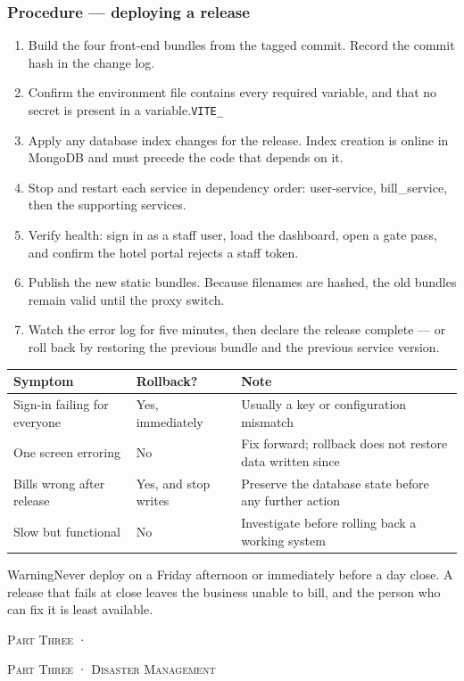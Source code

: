 \documentclass[11pt,a4paper,oneside]{book}
\begin{document}
\subsubsection*{Procedure — deploying a release}
\begin{enumerate}
\item Build the four front-end bundles from the tagged commit. Record the commit hash in the change log.
\item Confirm the environment file contains every required variable, and that no secret is present in a  variable.\texttt{VITE\_}
\item Apply any database index changes for the release. Index creation is online in MongoDB and must precede the code that depends on it.
\item Stop and restart each service in dependency order: user-service, bill\_service, then the supporting services.
\item Verify health: sign in as a staff user, load the dashboard, open a gate pass, and confirm the hotel portal rejects a staff token.
\item Publish the new static bundles. Because filenames are hashed, the old bundles remain valid until the proxy switch.
\item Watch the error log for five minutes, then declare the release complete — or roll back by restoring the previous bundle and the previous service version.
\end{enumerate}
\begin{center}\small
\begin{tabularx}{\linewidth}{|X|X|X|}
\hline
\rowcolor{lightgrey}
\textbf{Symptom} & \textbf{Rollback?} & \textbf{Note} \\ \hline
Sign-in failing for everyone & Yes, immediately & Usually a key or configuration mismatch \\ \hline
One screen erroring & No & Fix forward; rollback does not restore data written since \\ \hline
Bills wrong after release & Yes, and stop writes & Preserve the database state before any further action \\ \hline
Slow but functional & No & Investigate before rolling back a working system \\ \hline
\end{tabularx}
\end{center}
\begin{notebox}WarningNever deploy on a Friday afternoon or immediately before a day close. A release that fails at close leaves the business unable to bill, and the person who can fix it is least available.\end{notebox}
\textsc{\small\color{crimson}Part Three ·}\par\medskip
\textsc{\small\color{crimson}Part Three · Disaster Management}\par\medskip
\end{document}
